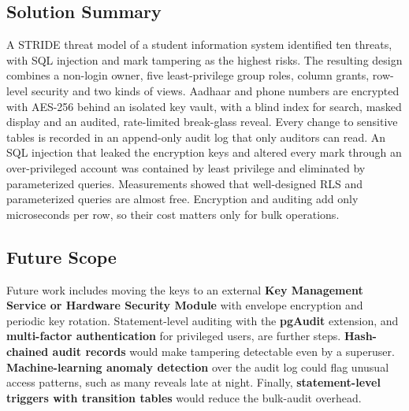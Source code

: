 \documentclass[11pt,a4paper]{report}
\begin{document}
\subsection{Solution Summary}
A STRIDE threat model of a student information system identified ten threats, with SQL injection and mark tampering as the highest risks. The resulting design combines a non-login owner, five least-privilege group roles, column grants, row-level security and two kinds of views. Aadhaar and phone numbers are encrypted with AES-256 behind an isolated key vault, with a blind index for search, masked display and an audited, rate-limited break-glass reveal. Every change to sensitive tables is recorded in an append-only audit log that only auditors can read. An SQL injection that leaked the encryption keys and altered every mark through an over-privileged account was contained by least privilege and eliminated by parameterized queries. Measurements showed that well-designed RLS and parameterized queries are almost free. Encryption and auditing add only microseconds per row, so their cost matters only for bulk operations.

\subsection{Future Scope}
Future work includes moving the keys to an external \textbf{Key Management Service or Hardware Security Module} with envelope encryption and periodic key rotation. Statement-level auditing with the \textbf{pgAudit} extension, and \textbf{multi-factor authentication} for privileged users, are further steps. \textbf{Hash-chained audit records} would make tampering detectable even by a superuser. \textbf{Machine-learning anomaly detection} over the audit log could flag unusual access patterns, such as many reveals late at night. Finally, \textbf{statement-level triggers with transition tables} would reduce the bulk-audit overhead.

\end{document}
